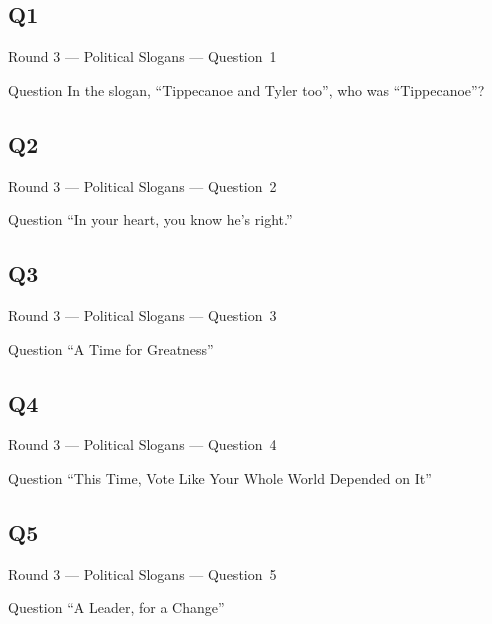 \documentclass[11pt]{beamer}
\begin{document}
\subsection*{Q1}
\begin{frame}[t]{Round 3 --- Political Slogans --- \mbox{Question 1}}
\vspace{-0.5em}
\begin{block}{Question}
In the slogan, ``Tippecanoe and Tyler too'', who was ``Tippecanoe''?
\end{block}
\end{frame}
\subsection*{Q2}
\begin{frame}[t]{Round 3 --- Political Slogans --- \mbox{Question 2}}
\vspace{-0.5em}
\begin{block}{Question}
``In your heart, you know he's right.''
\end{block}
\end{frame}
\subsection*{Q3}
\begin{frame}[t]{Round 3 --- Political Slogans --- \mbox{Question 3}}
\vspace{-0.5em}
\begin{block}{Question}
``A Time for Greatness''
\end{block}
\end{frame}
\subsection*{Q4}
\begin{frame}[t]{Round 3 --- Political Slogans --- \mbox{Question 4}}
\vspace{-0.5em}
\begin{block}{Question}
``This Time, Vote Like Your Whole World Depended on It''
\end{block}
\end{frame}
\subsection*{Q5}
\begin{frame}[t]{Round 3 --- Political Slogans --- \mbox{Question 5}}
\vspace{-0.5em}
\begin{block}{Question}
``A Leader, for a Change''
\end{block}
\end{frame}
\end{document}
